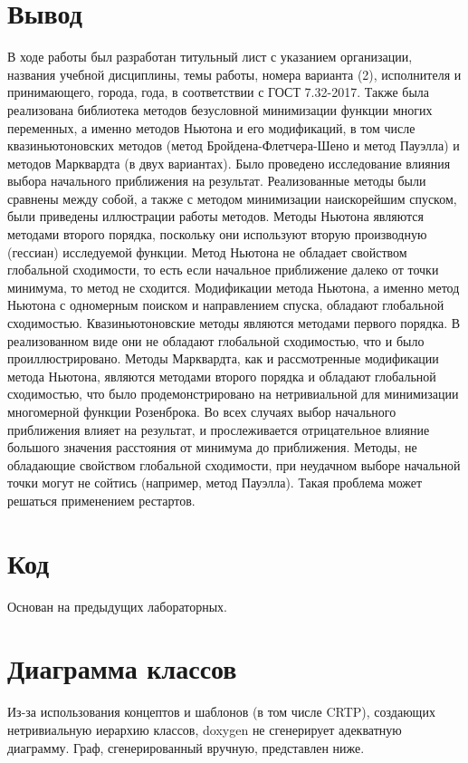 \documentclass[russian, english]{article}
\begin{document}
\section{Вывод}
В ходе работы был разработан титульный лист с указанием организации, названия учебной дисциплины, темы работы, номера варианта (2), исполнителя и принимающего, города, года, в соответствии с ГОСТ 7.32-2017. Также была реализована библиотека методов безусловной минимизации функции многих переменных, а именно методов Ньютона и его модификаций, в том числе квазиньютоновских методов (метод Бройдена-Флетчера-Шено и метод Пауэлла) и методов Марквардта (в двух вариантах). Было проведено исследование влияния выбора начального приближения на результат. Реализованные методы были сравнены между собой, а также с методом минимизации наискорейшим спуском, были приведены иллюстрации работы методов.
Методы Ньютона являются методами второго порядка, поскольку они используют вторую производную (гессиан) исследуемой функции. Метод Ньютона не обладает свойством глобальной сходимости, то есть если начальное приближение далеко от точки минимума, то метод не сходится. Модификации метода Ньютона, а именно метод Ньютона с одномерным поиском и направлением спуска, обладают глобальной сходимостью.
Квазиньютоновские методы являются методами первого порядка. В реализованном виде они не обладают глобальной сходимостью, что и было проиллюстрировано.
Методы Марквардта, как и рассмотренные модификации метода Ньютона, являются методами второго порядка и обладают глобальной сходимостью, что было продемонстрировано на нетривиальной для минимизации многомерной функции Розенброка.
Во всех случаях выбор начального приближения влияет на результат, и прослеживается отрицательное влияние большого значения расстояния от минимума до приближения. Методы, не обладающие свойством глобальной сходимости, при неудачном выборе начальной точки могут не сойтись (например, метод Пауэлла). Такая проблема может решаться применением рестартов.

\newpage
\appendix
\section{Код}
Основан на предыдущих лабораторных.

\section{Диаграмма классов}
Из-за использования концептов и шаблонов (в том числе CRTP), создающих нетривиальную иерархию классов, doxygen не сгенерирует адекватную диаграмму. Граф, сгенерированный вручную, представлен ниже. \\
\noindent{}
%
\end{document}
